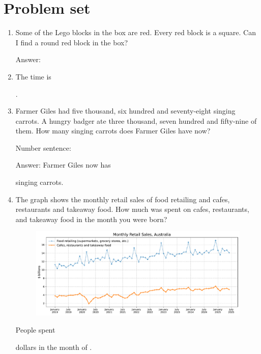 \documentclass{tufte-book}
\begin{document}
\clearpage\section{Problem set }

\begin{enumerate}

\item Some of the Lego blocks in the box are red. Every red block is a square. Can I find a round red block in the box?\medskip\par
Answer: \dotfill\medskip

\item {}
The time is \dotfill\medskip\par\dotfill\medskip.

\item Farmer Giles had five thousand, six hundred and seventy-eight singing carrots. A hungry badger ate three thousand, seven hundred and fifty-nine of them. How many singing carrots does Farmer Giles have now?\medskip\par
Number sentence: \dotfill\medskip\par
Answer: Farmer Giles now has 
\dotfill\medskip\par\mbox{}\dotfill\medskip\par\mbox{}\dotfill\bigskip
 singing carrots.

\item The graph shows the monthly retail sales of food retailing and cafes, restaurants and takeaway food.
How much was spent on cafes, restaurants, and takeaway food in the month you were born?\par
\begin{figure}[h]\includegraphics[width=1.3\textwidth]{fig/line_retail_sales_food.pdf}\end{figure}
People spent \dotfill\bigskip \par dollars in
the month of \dotfill\bigskip.


\end{enumerate}
\end{document}
